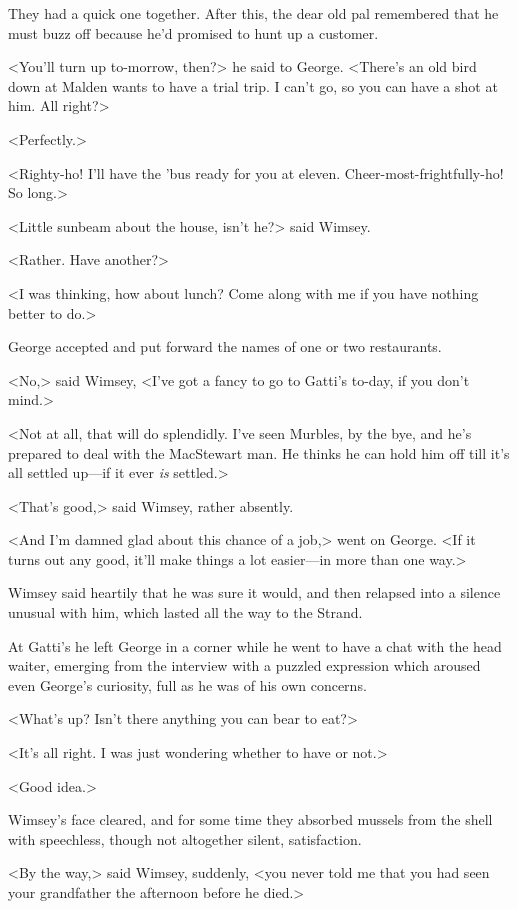They had a quick one together. After this, the dear old pal remembered that he must buzz off because he'd promised to hunt up a customer.

<You'll turn up to-morrow, then?> he said to George. <There's an old bird down at Malden wants to have a trial trip. I can't go, so you can have a shot at him. All right?>

<Perfectly.>

<Righty-ho! I'll have the 'bus ready for you at eleven. Cheer-most-frightfully-ho! So long.>

<Little sunbeam about the house, isn't he?> said Wimsey.

<Rather. Have another?>

<I was thinking, how about lunch? Come along with me if you have nothing better to do.>

George accepted and put forward the names of one or two restaurants.

<No,> said Wimsey, <I've got a fancy to go to Gatti's to-day, if you don't mind.>

<Not at all, that will do splendidly. I've seen Murbles, by the bye, and he's prepared to deal with the MacStewart man. He thinks he can hold him off till it's all settled up—if it ever \emph{is} settled.>

<That's good,> said Wimsey, rather absently.

<And I'm damned glad about this chance of a job,> went on George. <If it turns out any good, it'll make things a lot easier—in more than one way.>

Wimsey said heartily that he was sure it would, and then relapsed into a silence unusual with him, which lasted all the way to the Strand.

At Gatti's he left George in a corner while he went to have a chat with the head waiter, emerging from the interview with a puzzled expression which aroused even George's curiosity, full as he was of his own concerns.

<What's up? Isn't there anything you can bear to eat?>

<It's all right. I was just wondering whether to have  or not.>

<Good idea.>

Wimsey's face cleared, and for some time they absorbed mussels from the shell with speechless, though not altogether silent, satisfaction.

<By the way,> said Wimsey, suddenly, <you never told me that you had seen your grandfather the afternoon before he died.>

